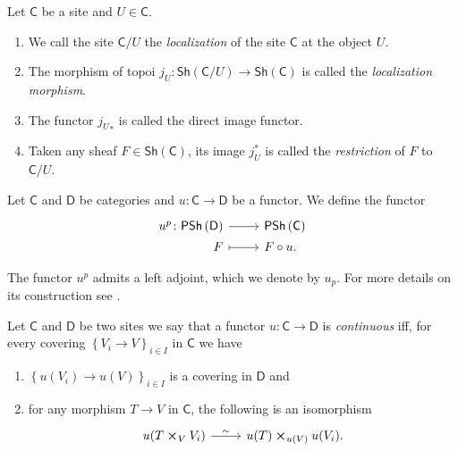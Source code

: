 \documentclass[../Main]{subfiles}
\begin{document}
\begin{defn}[Localization]
	Let $\mathsf{C}$ be a site and $U \in \mathsf{C}$.
\begin{enumerate}
	\item We call the site $\mathsf{C}/U$ the {\em localization}
		of the site $\mathsf{C}$ at the object $U$.
	\item The morphism of topoi 
		$j_U\colon \mathsf{Sh}\left(\mathsf{C}/U\right) \to \mathsf{Sh}\left(\mathsf{C}\right)$
		is called the {\em localization morphism}.
	\item The functor ${j_U}_*$ is called the direct image functor.
	\item Taken any sheaf $F \in \mathsf{Sh}\left(\mathsf{C}\right)$,
		its image $j_U^*$ is called the {\em restriction} of $F$ to $\mathsf{C}/U$.
\end{enumerate}
\end{defn}


\begin{defn}[]
	Let $\mathsf{C}$ and $\mathsf{D}$ be categories and $u\colon \mathsf{C} \to \mathsf{D}$
	be a functor.
	We define the functor
	\begin{equation*}
	\begin{tikzcd}[row sep = 0ex
		,/tikz/column 1/.append style={anchor=base east}
		,/tikz/column 2/.append style={anchor=base west}]
		u^p\colon \mathsf{PSh}\left( \mathsf{D} \right) \arrow[r, "", rightarrow] &
		\mathsf{PSh}\left( \mathsf{C} \right) \\
		F \arrow[r, "", mapsto] & 
		F \circ u
	.\end{tikzcd}
	\end{equation*} 
\end{defn}


\begin{rem}
	The functor $u^p$ admits a left adjoint, which we denote by $u_p$.
	For more details on its construction see 
	\cite[\href{https://stacks.math.columbia.edu/tag/00VC}{Section 00VC}]{SP}.
\end{rem}


\begin{defn}
	Let $\mathsf{C}$ and $\mathsf{D}$ be two sites we say that a
	functor $u\colon \mathsf{C} \to \mathsf{D}$ is {\em continuous}
	iff, for every covering $\left\{ V_{ i } \to V \right\}_{ i \in I }$ in $\mathsf{C}$
	we have
\begin{enumerate}
	\item $\left\{ u(V_{ i }) \to u(V) \right\}_{ i \in I }$ is a covering in $\mathsf{D}$ and
	\item for any morphism $T \to V$ in $\mathsf{C}$, the following is an isomorphism
		\begin{equation*}
		\begin{tikzcd}[row sep = 0ex
			,/tikz/column 1/.append style={anchor=base east}
			,/tikz/column 2/.append style={anchor=base west}]
			u(T \cross_{ V } V_i) \arrow[r, "\sim", rightarrow] &
			u(T) \cross_{u(V)} u(V_i)
		.\end{tikzcd}
		\end{equation*} 
\end{enumerate}
\end{defn}
\end{document}
